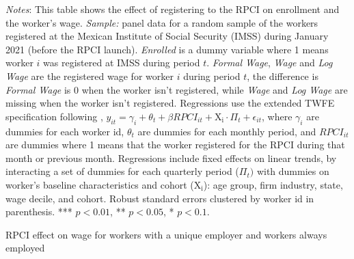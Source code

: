 \documentclass[oneside,11pt]{article}
\begin{document}
\begin{table}[H]
\begin{threeparttable}
\begin{tablenotes}
\setlength{}
\footnotesize
\item \textit{Notes}: This table shows the effect of registering to the RPCI on enrollment and the worker's wage. \textit{Sample:} panel data for a random sample of the workers registered at the Mexican Institute of Social Security (IMSS) during January 2021 (before the RPCI launch). \textit{Enrolled} is a dummy variable where 1 means worker $i$ was registered at IMSS during period $t$. \textit{Formal Wage}, \textit{Wage} and \textit{Log Wage} are the registered wage for worker $i$ during period $t$, the difference is \textit{Formal Wage} is 0 when the worker isn't registered, while \textit{Wage} and \textit{Log Wage} are missing when the worker isn't registered. Regressions use the extended TWFE specification following \cite{wooldridge2021two}, $y_{it} = \gamma_{i} + \theta_{t}+ \beta RPCI_{it} + \mathrm{X_i}\cdot\Pi_t +\epsilon_{it}$, where $\gamma_{i}$ are dummies for each worker id, $\theta_{t}$ are dummies for each monthly period, and $RPCI_{it}$ are dummies where 1 means that the worker registered for the RPCI during that month or previous month. Regressions include fixed effects on linear trends, by interacting a set of dummies for each quarterly period ($\Pi_t)$ with dummies on worker's baseline characteristics and cohort ($\mathrm{X_i}$): age group, firm industry, state, wage decile, and cohort. Robust standard errors clustered by worker id in parenthesis. *** $p<0.01$, ** $p<0.05$, * $p<0.1$.
\end{tablenotes}
\end{threeparttable}
\end{table}

\clearpage

\begin{table}[H]
    \caption{RPCI effect on wage for workers with a unique employer and workers always employed}
    \label{twfe_wage_same_idrfc}
    \begin{center}
    \scriptsize{}
    \end{center}
\end{table}
\end{document}
